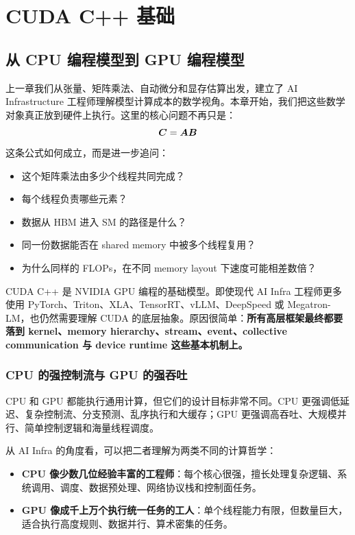 \chapter{CUDA C++ 基础}
\label{chap:cuda-cpp}

\section{从 CPU 编程模型到 GPU 编程模型}
\label{sec:cpu-to-gpu-programming-model}

上一章我们从张量、矩阵乘法、自动微分和显存估算出发，建立了 AI Infrastructure 工程师理解模型计算成本的数学视角。本章开始，我们把这些数学对象真正放到硬件上执行。这里的核心问题不再只是：
\[
  \bm{C}=\bm{A}\bm{B}
\]
这条公式如何成立，而是进一步追问：

\begin{itemize}
  \item 这个矩阵乘法由多少个线程共同完成？
  \item 每个线程负责哪些元素？
  \item 数据从 HBM 进入 SM 的路径是什么？
  \item 同一份数据能否在 shared memory 中被多个线程复用？
  \item 为什么同样的 FLOPs，在不同 memory layout 下速度可能相差数倍？
\end{itemize}

CUDA C++ 是 NVIDIA GPU 编程的基础模型。即使现代 AI Infra 工程师更多使用 PyTorch、Triton、XLA、TensorRT、vLLM、DeepSpeed 或 Megatron-LM，也仍然需要理解 CUDA 的底层抽象。原因很简单：\textbf{所有高层框架最终都要落到 kernel、memory hierarchy、stream、event、collective communication 与 device runtime 这些基本机制上。}

\subsection{CPU 的强控制流与 GPU 的强吞吐}
\label{subsec:cpu-control-gpu-throughput}

CPU 和 GPU 都能执行通用计算，但它们的设计目标非常不同。CPU 更强调低延迟、复杂控制流、分支预测、乱序执行和大缓存；GPU 更强调高吞吐、大规模并行、简单控制逻辑和海量线程调度。

从 AI Infra 的角度看，可以把二者理解为两类不同的计算哲学：

\begin{itemize}
  \item \textbf{CPU 像少数几位经验丰富的工程师}：每个核心很强，擅长处理复杂逻辑、系统调用、调度、数据预处理、网络协议栈和控制面任务。
  \item \textbf{GPU 像成千上万个执行统一任务的工人}：单个线程能力有限，但数量巨大，适合执行高度规则、数据并行、算术密集的任务。
\end{itemize}

